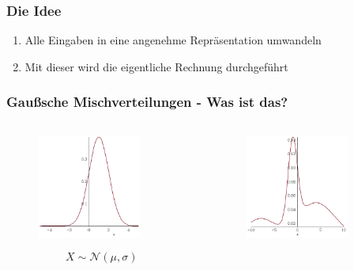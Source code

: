 \documentclass[11pt]{beamer}
\begin{document}
\begin{frame}
  \frametitle{Die Idee}
  \begin{enumerate}
  \item Alle Eingaben in eine angenehme Repräsentation umwandeln
  \item Mit dieser wird die eigentliche Rechnung durchgeführt
  \end{enumerate}
\end{frame}

\begin{frame}
  \frametitle{Gaußsche Mischverteilungen - Was ist das?}
  \begin{columns}[T]
    \begin{column}{.5\textwidth}
      \begin{figure}
        \includegraphics[width=0.8\textwidth]{presentation/mixtures-one}
      \end{figure}
      \begin{equation*}
        X \sim \mathcal{N}(\mu, \sigma)
      \end{equation*}
    \end{column}
    \begin{column}{.5\textwidth}
      \begin{figure}
        \includegraphics[width=0.8\textwidth]{presentation/mixtures-multiple}

\end{figure}
\end{column}
\end{columns}
\end{frame}
\end{document}
